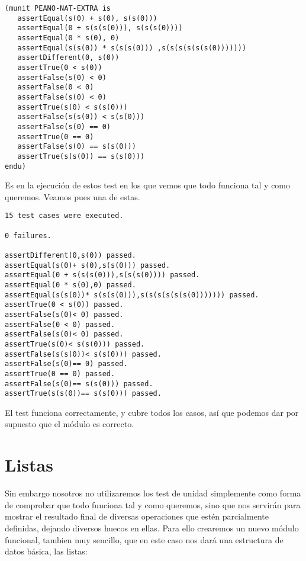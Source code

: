 {\codesize
\begin{verbatim}
(munit PEANO-NAT-EXTRA is
   assertEqual(s(0) + s(0), s(s(0)))
   assertEqual(0 + s(s(s(0))), s(s(s(0))))
   assertEqual(0 * s(0), 0)
   assertEqual(s(s(0)) * s(s(s(0))) ,s(s(s(s(s(s(0)))))))
   assertDifferent(0, s(0))
   assertTrue(0 < s(0))
   assertFalse(s(0) < 0)
   assertFalse(0 < 0)
   assertFalse(s(0) < 0)
   assertTrue(s(0) < s(s(0)))
   assertFalse(s(s(0)) < s(s(0)))
   assertFalse(s(0) == 0)
   assertTrue(0 == 0)
   assertFalse(s(0) == s(s(0)))
   assertTrue(s(s(0)) == s(s(0)))
endu)

\end{verbatim}
}

Es en la ejecución de estos test en los que vemos que todo funciona tal y como queremos. Veamos pues una de estas. \par

{\codesize
\begin{verbatim}
15 test cases were executed.

0 failures.

assertDifferent(0,s(0)) passed.
assertEqual(s(0)+ s(0),s(s(0))) passed.
assertEqual(0 + s(s(s(0))),s(s(s(0)))) passed.
assertEqual(0 * s(0),0) passed.
assertEqual(s(s(0))* s(s(s(0))),s(s(s(s(s(s(0))))))) passed.
assertTrue(0 < s(0)) passed.
assertFalse(s(0)< 0) passed.
assertFalse(0 < 0) passed.
assertFalse(s(0)< 0) passed.
assertTrue(s(0)< s(s(0))) passed.
assertFalse(s(s(0))< s(s(0))) passed.
assertFalse(s(0)== 0) passed.
assertTrue(0 == 0) passed.
assertFalse(s(0)== s(s(0))) passed.
assertTrue(s(s(0))== s(s(0))) passed.
\end{verbatim}
}

El test funciona correctamente, y cubre todos los casos, así que podemos dar por supuesto que el módulo es correcto. \par

\section{Listas}

Sin embargo nosotros no utilizaremos los test de unidad simplemente como forma de comprobar que todo funciona tal y como queremos, sino que nos servirán para mostrar el resultado final de diversas operaciones que estén parcialmente definidas, dejando diversos huecos en ellas. Para ello crearemos un nuevo módulo funcional, tambien muy sencillo, que en este caso nos dará una estructura de datos básica, las listas: \par


